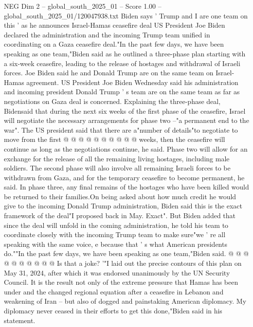 \begin{textsample}{NEG Dim 2 – global\_south\_2025\_01 – Score 1.00 – global\_south\_2025\_01/120047938.txt}  \label{ex:f2_neg_137}
Biden says ' Trump and I are one team on this ' as he announces Israel-Hamas ceasefire deal US President Joe Biden declared the administration and the incoming Trump team unified in coordinating on a Gaza ceasefire deal."In the past few days, we have been speaking as one team,"Biden said as he outlined a three-phase plan starting with a six-week ceasefire, leading to the release of hostages and withdrawal of Israeli forces.
Joe Biden said he and Donald Trump are on the same team on Israel-Hamas agreement.
US President Joe Biden Wednesday said his administration and incoming president Donald Trump ' s team are on the same team as far as negotiations on Gaza deal is concerned.
Explaining the three-phase deal, Bidensaid that during the next six weeks of the first phase of the ceasefire, Israel will negotiate the necessary arrangements for phase two --"a permanent end to the war".
The US president said that there are a"number of details"to negotiate to move from the first @ @ @ @ @ @ @ @ @ @ weeks, then the ceasefire will continue as long as the negotiations continue, he said.
Phase two will allow for an exchange for the release of all the remaining living hostages, including male soldiers.
The second phase will also involve all remaining Israeli forces to be withdrawn from Gaza, and for the temporary ceasefire to become permanent, he said.
In phase three, any final remains of the hostages who have been killed would be returned to their families.On being asked about how much credit he would give to the incoming Donald Trump administration, Biden said this is the exact framework of the deal"I proposed back in May.
Exact".
But Biden added that since the deal will unfold in the coming administration, he told his team to coordinate closely with the incoming Trump team to make sure"we ' re all speaking with the same voice, e because that ' s what American presidents do.""In the past few days, we have been speaking as one team,"Biden said. @ @ @ @ @ @ @ @ @ @ Is that a joke? '"I laid out the precise contours of this plan on May 31, 2024, after which it was endorsed unanimously by the UN Security Council.
It is the result not only of the extreme pressure that Hamas has been under and the changed regional equation after a ceasefire in Lebanon and weakening of Iran -- but also of dogged and painstaking American diplomacy.
My diplomacy never ceased in their efforts to get this done,"Biden said in his statement.

\end{textsample}
